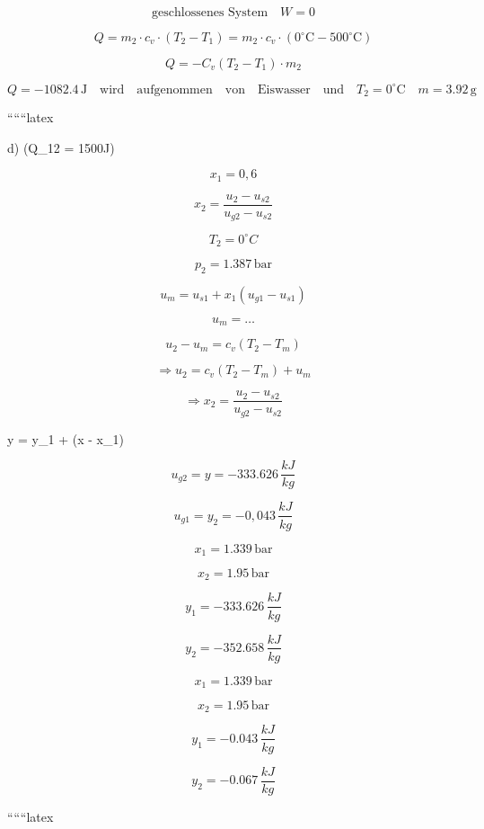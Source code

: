 \[
\text{geschlossenes System} \quad W = 0
\]

\[
Q = m_{2} \cdot c_{v} \cdot (T_{2} - T_{1}) = m_{2} \cdot c_{v} \cdot (0^\circ \text{C} - 500^\circ \text{C})
\]

\[
Q = -C_{v}(T_{2} - T_{1}) \cdot m_{2}
\]

\[
Q = -1082.4 \, \text{J} \quad \text{wird} \quad \text{aufgenommen} \quad \text{von} \quad \text{Eiswasser} \quad \text{und} \quad T_{2} = 0^\circ \text{C} \quad m = 3.92 \, \text{g}
\]

``````latex


d) \quad {} (Q_{12} = 1500J) 

\[
x_1 = 0,6
\]

\[
x_2 = \frac{u_2 - u_{s2}}{u_{g2} - u_{s2}}
\]

\[
T_2 = 0^\circ C
\]

\[
p_2 = 1.387 \, \text{bar}
\]

\[
u_m = u_{s1} + x_1 (u_{g1} - u_{s1})
\]


\[
u_m = \ldots
\]

\[
u_2 - u_m = c_v (T_2 - T_m)
\]

\[
\Rightarrow u_2 = c_v (T_2 - T_m) + u_m
\]

\[
\Rightarrow x_2 = \frac{u_2 - u_{s2}}{u_{g2} - u_{s2}}
\]

 y = y_1 +  (x - x_1)


\[
u_{g2} = y = -333.626 \, \frac{kJ}{kg}
\]

\[
u_{g1} = y_2 = -0,043 \, \frac{kJ}{kg}
\]


\[
x_1 = 1.339 \, \text{bar}
\]

\[
x_2 = 1.95 \, \text{bar}
\]

\[
y_1 = -333.626 \, \frac{kJ}{kg}
\]

\[
y_2 = -352.658 \, \frac{kJ}{kg}
\]

\[
x_1 = 1.339 \, \text{bar}
\]

\[
x_2 = 1.95 \, \text{bar}
\]

\[
y_1 = -0.043 \, \frac{kJ}{kg}
\]

\[
y_2 = -0.067 \, \frac{kJ}{kg}
\]

``````latex


